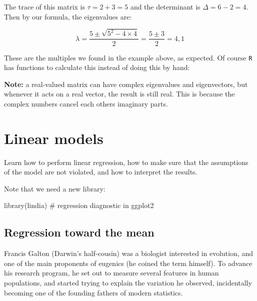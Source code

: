 \documentclass[
  letterpaper,
  DIV=11,
  numbers=noendperiod]{scrreprt}
\newenvironment{Shaded}{\begin{snugshade}}{\end{snugshade}}
\newcommand{\NormalTok}[1]{\textcolor[rgb]{0.00,0.23,0.31}{#1}}
\begin{document}
The trace of this matrix is \(\tau = 2+3 =5\) and the determinant is
\(\Delta = 6 - 2 = 4\). Then by our formula, the eigenvalues are:

\[
\lambda = \frac{5 \pm \sqrt{5^2-4 \times 4}}{2}  =  \frac{5 \pm 3}{2}  = 4, 1
\]

These are the multiples we found in the example above, as expected. Of
course \texttt{R} has functions to calculate this instead of doing this
by hand:

\begin{Shaded}
\end{Shaded}

\textbf{Note:} a real-valued matrix can have complex eigenvalues and
eigenvectors, but whenever it acts on a real vector, the result is still
real. This is because the complex numbers cancel each others imaginary
parts.


\chapter{Linear models}\label{linear-models}

Learn how to perform linear regression, how to make sure that the
assumptions of the model are not violated, and how to interpret the
results.

Note that we need a new library:

\begin{Shaded}
\begin{Highlighting}[]
\NormalTok{library(lindia) \# regression diagnostic in ggplot2}
\end{Highlighting}
\end{Shaded}

\section{Regression toward the mean}\label{regression-toward-the-mean}

Francis Galton (Darwin's half-cousin) was a biologist interested in
evolution, and one of the main proponents of eugenics (he coined the
term himself). To advance his research program, he set out to measure
several features in human populations, and started trying to explain the
variation he observed, incidentally becoming one of the founding fathers
of modern statistics.
\end{document}
